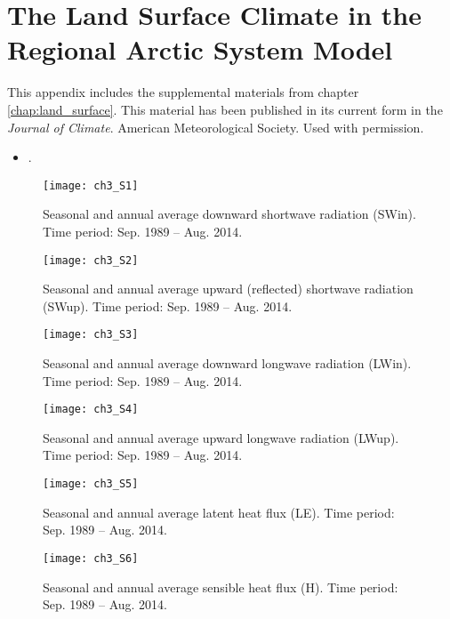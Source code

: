 \appendix
\raggedbottom\sloppy

\chapter{The Land Surface Climate in the Regional Arctic System Model}
\label{chap:land_surface_sup}

This appendix includes the supplemental materials from chapter \ref{chap:land_surface}.
This material has been published in its current form in the \textit{Journal of Climate}.
\textcopyright American Meteorological Society.
Used with permission.
\begin{itemize}
    \item {}.
\end{itemize}

\begin{figure}
    \centering
    \texttt{[image: ch3\_S1]}
    \caption{Seasonal and annual average downward shortwave radiation (SWin).
    Time period: Sep. 1989 – Aug. 2014.}
\end{figure}

\begin{figure}
    \centering
    \texttt{[image: ch3\_S2]}
    \caption{Seasonal and annual average upward (reflected) shortwave radiation (SWup).
    Time period: Sep. 1989 – Aug. 2014.}
\end{figure}

\begin{figure}
    \centering
    \texttt{[image: ch3\_S3]}
    \caption{Seasonal and annual average downward longwave radiation (LWin).
    Time period: Sep. 1989 – Aug. 2014.}
\end{figure}

\begin{figure}
    \centering
    \texttt{[image: ch3\_S4]}
    \caption{Seasonal and annual average upward longwave radiation (LWup).
    Time period: Sep. 1989 – Aug. 2014.}
\end{figure}

\begin{figure}
    \centering
    \texttt{[image: ch3\_S5]}
    \caption{Seasonal and annual average latent heat flux (LE).
    Time period: Sep. 1989 – Aug. 2014.}
\end{figure}

\begin{figure}
    \centering
    \texttt{[image: ch3\_S6]}
    \caption{Seasonal and annual average sensible heat flux (H).
    Time period: Sep. 1989 – Aug. 2014.}
\end{figure}

